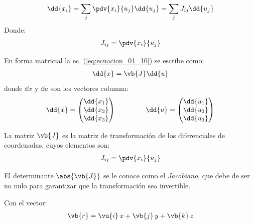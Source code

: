 \begin{align}
\dd{x_{i}} = \sum_{j} \pdv{x_{i}}{u_{j}} \dd{u_{j}} = \sum_{j} J_{ij} \dd{u_{j}}
\label{eq:ecuacion_01_10}
\end{align}
Donde:
\begin{align}
J_{ij} = \pdv{x_{i}}{u_{j}}
\label{eq:ecuacion_01_11}
\end{align}

En forma matricial la ec. (\ref{eq:ecuacion_01_10}) se escribe como:
\begin{align}
\dd{x} = \vb{J} \dd{u}
\end{align}
donde $\dd{x}$ y $\dd{u}$ son los vectores columna:
\begin{align*}
\dd{x} = \begin{pmatrix}
\dd{x_{1}} \\
\dd{x_{2}} \\
\dd{x_{3}} \\
\end{pmatrix}
\hspace{1.5cm}
\dd{u} = \begin{pmatrix}
\dd{u_{1}} \\
\dd{u_{2}} \\
\dd{u_{3}} \\
\end{pmatrix}
\end{align*}

La matriz $\vb{J}$ es la matriz de transformación de los diferenciales de coordenadas, cuyos elementos son:
\begin{align*}
J_{ij} = \pdv{x_{i}}{u_{j}}
\end{align*}

El determinante $\abs{\vb{J}}$ se le conoce como el \emph{Jacobiano}, que debe de ser no nulo para garantizar que la transformación sea invertible.

Con el vector:
\begin{align*}
\vb{r} = \vu{i} \, x + \vb{j} \, y + \vb{k} \,z
\end{align*}

